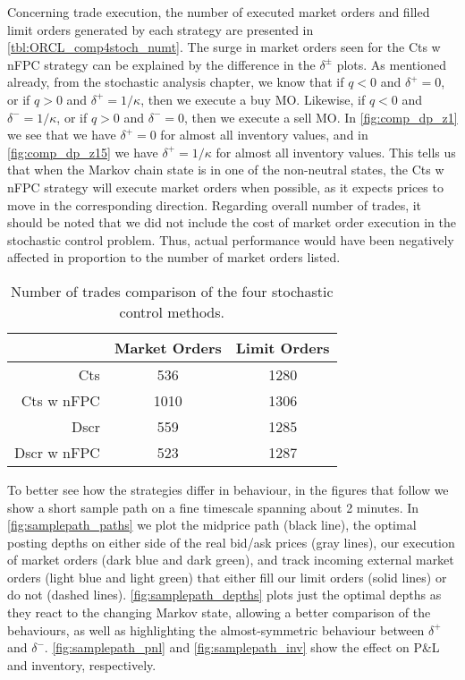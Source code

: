 Concerning trade execution, the number of executed market orders and filled limit orders generated by each strategy are presented in \autoref{tbl:ORCL_comp4stoch_numt}. The surge in market orders seen for the Cts w nFPC strategy can be explained by the difference in the $\delta^\pm$ plots. As mentioned already, from the stochastic analysis chapter, we know that if $q < 0 $ and $\delta^+ =0$, or if $q > 0$ and $\delta^+ = 1/\kappa$, then we execute a buy MO. Likewise, if $q < 0 $ and $\delta^- =1/\kappa$, or if $q > 0$ and $\delta^- = 0$, then we execute a sell MO. In \autoref{fig:comp_dp_z1} we see that we have $\delta^+ = 0$ for almost all inventory values, and in \autoref{fig:comp_dp_z15} we have  $\delta^+ = 1/\kappa$ for almost all inventory values. This tells us that when the Markov chain state is in one of the non-neutral states, the Cts w nFPC strategy will execute market orders when possible, as it expects prices to move in the corresponding direction. Regarding overall number of trades, it should be noted that we did not include the cost of market order execution in the stochastic control problem. Thus, actual performance would have been negatively affected in proportion to the number of market orders listed.
\begin{table}
\centering
{}
\begin{tabular}{@{} r *{2}{c} @{}}
\toprule
& Market Orders & Limit Orders \\
\midrule
Cts          &  536 & 1280 \\
Cts w nFPC   & 1010 & 1306 \\
Dscr         &  559 & 1285 \\
Dscr w nFPC  &  523 & 1287 \\
\bottomrule
\end{tabular}
\caption{Number of trades comparison of the four stochastic control methods.}
\label{tbl:ORCL_comp4stoch_numt}
\end{table}

To better see how the strategies differ in behaviour, in the figures that follow we show a short sample path on a fine timescale spanning about 2 minutes. In \autoref{fig:samplepath_paths} we plot the midprice path (black line), the optimal posting depths on either side of the real bid/ask prices (gray lines), our execution of market orders (dark blue and dark green), and track incoming external market orders (light blue and light green) that either fill our limit orders (solid lines) or do not (dashed lines). \autoref{fig:samplepath_depths} plots just the optimal depths as they react to the changing Markov state, allowing a better comparison of the behaviours, as well as highlighting the almost-symmetric behaviour between $\delta^+$ and $\delta^-$. \autoref{fig:samplepath_pnl} and \autoref{fig:samplepath_inv} show the effect on P\&L and inventory, respectively. 

